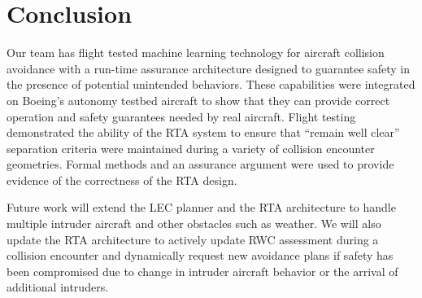 \section{Conclusion}

%
%


Our team has flight tested machine learning technology for aircraft collision avoidance with a
run-time assurance architecture designed to guarantee safety in the presence of potential
unintended behaviors.  These capabilities were integrated on Boeing's
autonomy testbed aircraft to show that they can provide correct operation and
safety guarantees needed by real aircraft.  Flight testing demonstrated the ability of the RTA
system to ensure that ``remain well clear'' separation criteria were maintained during a variety of 
collision encounter geometries.  Formal methods and an assurance argument were used to 
provide evidence of the correctness of the RTA design. 

Future work will extend the LEC planner and the RTA architecture to handle multiple intruder 
aircraft and other obstacles such as weather.  We will also update the RTA architecture to 
actively update RWC assessment during a collision encounter and dynamically request
new avoidance plans if safety has been compromised due to change in intruder aircraft behavior 
or the arrival of additional intruders.  
